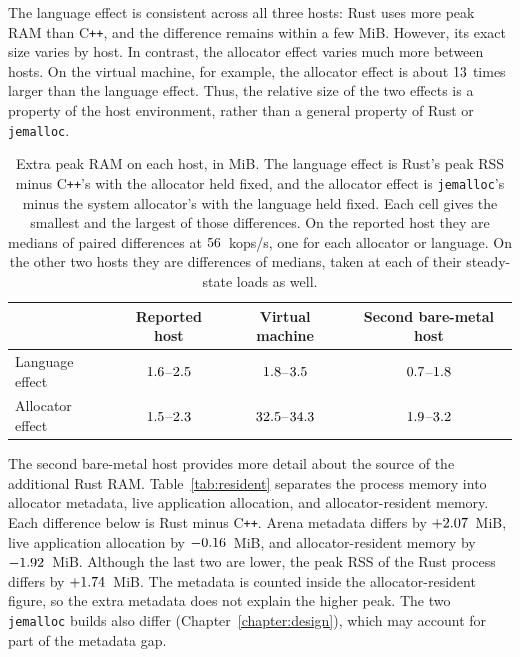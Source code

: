 \documentclass[english,oneside,a4paper,censored,csm,software-track-2020]{HYthesisML}
\begin{document}
The language effect is consistent across all three hosts: Rust uses more
peak RAM than C\texttt{++}, and the difference remains within a few MiB.
However, its exact size varies by host. In contrast, the allocator effect
varies much more between hosts. On the virtual machine, for example, the
allocator effect is about $13$ times larger than the
language effect. Thus, the relative size of the two effects is a property
of the host environment, rather than a general property of Rust or
\texttt{jemalloc}.

\enlargethispage{24pt}
\begin{table}[!ht]
\centering
\small
\caption[Extra peak RAM on each host]{Extra peak RAM on each host, in MiB.
The language effect is Rust's peak RSS minus C\texttt{++}'s with the allocator
held fixed, and the allocator effect is \texttt{jemalloc}'s minus the system
allocator's with the language held fixed. Each cell gives the smallest and the
largest of those differences. On the reported host they are medians of paired
differences at $56$~kops/s, one for each allocator or language. On the
other two hosts they are differences of medians, taken at each of their
steady-state loads as well.\label{tab:rsshosts}}
\renewcommand{\arraystretch}{1.2}
\begin{tabular}{@{}lccc@{}}
\hline\hline
 & Reported host & Virtual machine & Second bare-metal host \\
\hline
Language effect & $1.6$--$2.5$
  & $1.8$--$3.5$ & $0.7$--$1.8$ \\
Allocator effect & $1.5$--$2.3$
  & $32.5$--$34.3$ & $1.9$--$3.2$ \\
\hline
\end{tabular}
\end{table}

\FloatBarrier
The second bare-metal host provides more detail about the source of the
additional Rust RAM. Table~\ref{tab:resident} separates the process memory
into allocator metadata, live application allocation, and
allocator-resident memory. Each difference below is Rust minus C\texttt{++}. Arena
metadata differs by $+2.07$~MiB, live application allocation by
$-0.16$~MiB, and allocator-resident memory by $-1.92$~MiB.
Although the last two are lower, the peak RSS of the Rust process differs by
$+1.74$~MiB. The metadata is counted inside
the allocator-resident figure, so the extra metadata does not explain the higher
peak. The two \texttt{jemalloc} builds also differ (Chapter~\ref{chapter:design}),
which may account for part of the metadata gap.
\end{document}
